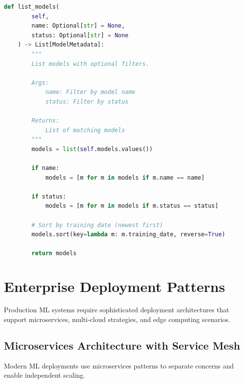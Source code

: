 \begin{lstlisting}[language=Python, caption={Model Registry for Version Management}]
    def list_models(
        self,
        name: Optional[str] = None,
        status: Optional[str] = None
    ) -> List[ModelMetadata]:
        """
        List models with optional filters.

        Args:
            name: Filter by model name
            status: Filter by status

        Returns:
            List of matching models
        """
        models = list(self.models.values())

        if name:
            models = [m for m in models if m.name == name]

        if status:
            models = [m for m in models if m.status == status]

        # Sort by training date (newest first)
        models.sort(key=lambda m: m.training_date, reverse=True)

        return models
\end{lstlisting}

\section{Enterprise Deployment Patterns}

Production ML systems require sophisticated deployment architectures that support microservices, multi-cloud strategies, and edge computing scenarios.

\subsection{Microservices Architecture with Service Mesh}

Modern ML deployments use microservices patterns to separate concerns and enable independent scaling.


